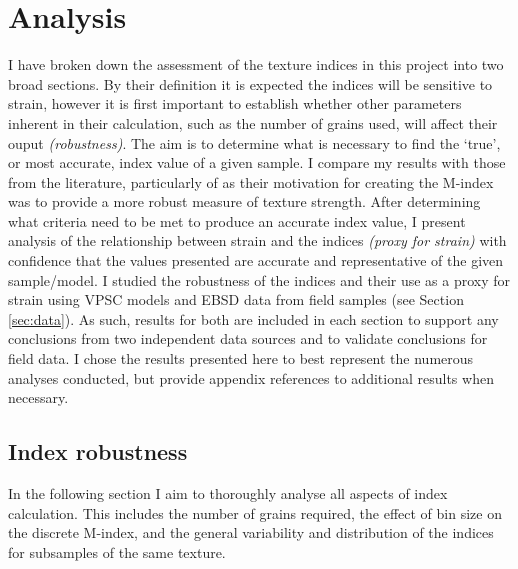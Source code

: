 \documentclass[a4paper,12pt,twoside]{report}
\numberwithin{equation}{chapter}
\begin{document}
\chapter{Analysis} \label{chap:analysis}
\vspace{-1cm}
I have broken down the assessment of the texture indices in this project into two broad sections. By their definition it is expected the indices will be sensitive to strain, however it is first important to establish whether other parameters inherent in their calculation, such as the number of grains used, will affect their ouput \emph{(robustness)}. The aim is to determine what is necessary to find the \lq{}true\rq{}, or most accurate, index value of a given sample. I compare my results with those from the literature, particularly of \cite{Skemer} as their motivation for creating the M-index was to provide a more robust measure of texture strength. After determining what criteria need to be met to produce an accurate index value, I present analysis of the relationship between strain and the indices \emph{(proxy for strain)} with confidence that the values presented are accurate and representative of the given sample/model. I studied the robustness of the indices and their use as a proxy for strain using VPSC models and EBSD data from field samples (see Section \ref{sec:data}). As such, results for both are included in each section to support any conclusions from two independent data sources and to validate conclusions for field data. I chose the results presented here to best represent the numerous analyses conducted, but provide appendix references to additional results when necessary.       


\section{Index robustness}
In the following section I aim to thoroughly analyse all aspects of index calculation. This includes the number of grains required, the effect of bin size on the discrete M-index, and the general variability and distribution of the indices for subsamples of the same texture. 
\end{document}
